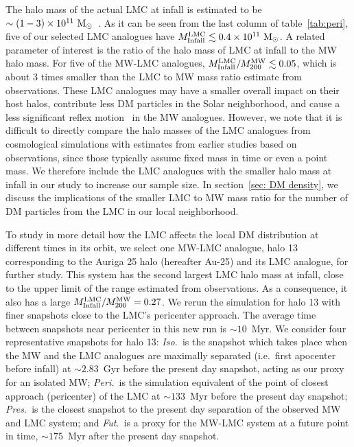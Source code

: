 The halo mass of the actual LMC at infall is estimated to be $\sim(1-3) \times 10^{11}~{\rm M}_\odot$~\cite{Moster:2012fv, Laporte:2016vuu, Penarrubia:2015hqa, Erkal:2019}. As it can be seen from the last column of table~\ref{tab:peri}, five of our selected LMC analogues have $M_{\rm Infall}^{\rm LMC} \lesssim 0.4 \times 10^{11}~{\rm M}_\odot$. A related parameter of interest  is the ratio of the halo mass of LMC at infall to the MW halo mass. For five of the MW-LMC analogues, $M_{\rm Infall}^{\rm LMC}/M_{200}^{\rm MW}\lesssim 0.05$, which is about 3 times smaller than the LMC to MW mass ratio estimate from observations. These LMC analogues may have a smaller overall impact on their host halos, contribute less DM particles in the Solar neighborhood, and cause a less significant reflex motion~\cite{Gomez:2014tda, Peterson_2020_MNRAS, Donaldson:2021byu} in the MW analogues. However, we note that 
it is difficult to directly compare the halo masses of the LMC analogues from cosmological simulations with estimates from earlier studies based on observations, since those typically assume fixed mass in time or even a point mass. We therefore include the LMC analogues with the smaller halo mass at infall in our study to increase our sample size. In section~\ref{sec: DM density}, we discuss the implications of the smaller LMC to MW mass ratio for the number of DM particles from the LMC in our local neighborhood.

To study in more detail how the LMC affects the local DM distribution at different times in its orbit, we  select  one MW-LMC analogue, halo 13 corresponding to the Auriga 25 halo (hereafter Au-25) and its LMC analogue, for further study. This system has the second largest LMC halo mass at infall, close to the upper limit of the range estimated from observations. As a consequence, it also has a large $M_{\rm Infall}^{\rm LMC}/M_{200}^{\rm MW}=0.27$. We rerun the simulation for halo 13 with finer snapshots close to the LMC's pericenter approach. The average time between snapshots near pericenter in this new run is $\sim 10$~Myr. We consider four representative snapshots for halo 13: 
\emph{Iso.}~is the snapshot which takes place when the MW and the LMC analogues are maximally separated (i.e.~first apocenter before infall) at $\sim 2.83$~Gyr before the present day snapshot, acting as our proxy for an isolated MW; \emph{Peri.}~is the simulation equivalent of the point of closest approach (pericenter) of the LMC at $\sim 133$~Myr before the present day snapshot; \emph{Pres.}~is the closest snapshot to the present day separation of the observed MW and LMC system; and \emph{Fut.}~is a proxy for the MW-LMC system at a future point in time, $\sim 175$~Myr after the present day snapshot. 
 
